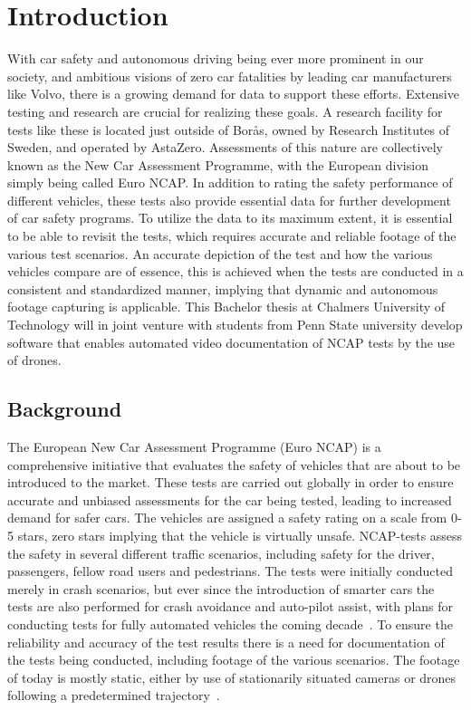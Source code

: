 \chapter{Introduction} \label{Introduction}

With car safety and autonomous driving being ever more prominent in our society, and ambitious visions of zero car fatalities by leading car manufacturers like Volvo, there is a growing demand for data to support these efforts. Extensive testing and research are crucial for realizing these goals. A research facility for tests like these is located just outside of Borås, owned by Research Institutes of Sweden, and opera\-ted by AstaZero. Assessments of this nature are collectively known as the New Car Assessment Programme, with the European division simply being called Euro NCAP. In addition to rating the safety performance of different vehicles, these tests also provide essential data for further development of car safety programs. To utilize the data to its maximum extent, it is essential to be able to revisit the tests, which requires accurate and reliable footage of the various test scenarios. An accurate depiction of the test and how the various vehicles compare are of essence, this is achieved when the tests are conducted in a consistent and standardized manner, implying that dynamic and autonomous footage capturing is applicable. This Bachelor thesis at Chalmers University of Technology will in joint venture with students from Penn State university develop software that enables automated video documentation of NCAP tests by the use of drones. 

\section{Background} \label{Background}
The European New Car Assessment Programme (Euro NCAP) is a comprehensive initiative that evaluates the safety of vehicles that are about to be introduced to the market. These tests are carried out globally in order to ensure accurate and unbiased assessments for the car being tested, leading to increased demand for safer cars. The vehicles are assigned a safety rating on a scale from 0-5 stars, zero stars implying that the vehicle is virtually unsafe. NCAP-tests assess the safety in several different traffic scenarios, including safety for the driver, passengers, fellow road users and pedestrians. The tests were initially conducted merely in crash scenarios, but ever since the introduction of smarter cars the tests are also performed for crash avoidance and auto-pilot assist, with plans for conducting tests for fully automated vehicles the coming decade~\cite{EuroNCAP2022EuroMobility}. 
\bigskip
\newline
To ensure the reliability and accuracy of the test results there is a need for documentation of the tests being conducted, including footage of the various scenarios. The footage of today is mostly static, either by use of stationarily situated cameras or drones following a predetermined trajectory~\cite{EuroNCAP2021EUROPEANPROTOCOL}. 
\bigskip
\newline

